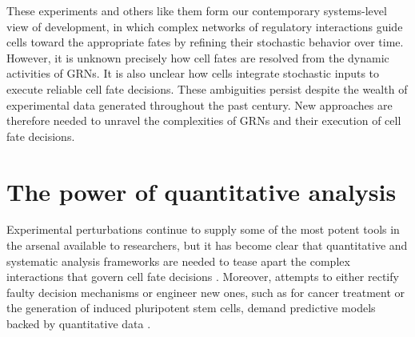 These experiments and others like them form our contemporary systems-level view of development, in which complex networks of regulatory interactions guide cells toward the appropriate fates by refining their stochastic behavior over time. However, it is unknown precisely how cell fates are resolved from the dynamic activities of GRNs. It is also unclear how cells integrate stochastic inputs to execute reliable cell fate decisions. These ambiguities persist despite the wealth of experimental data generated throughout the past century. New approaches are therefore needed to unravel the complexities of GRNs and their execution of cell fate decisions.

\section{The power of quantitative analysis}

Experimental perturbations continue to supply some of the most potent tools in the arsenal available to researchers, but it has become clear that quantitative and systematic analysis frameworks are needed to tease apart the complex interactions that govern cell fate decisions \cite{Lazebnik2004,Oates2009}. Moreover, attempts to either rectify faulty decision mechanisms or engineer new ones, such as for cancer treatment or the generation of induced pluripotent stem cells, demand predictive models backed by quantitative data \cite{Hornberg2006}.

